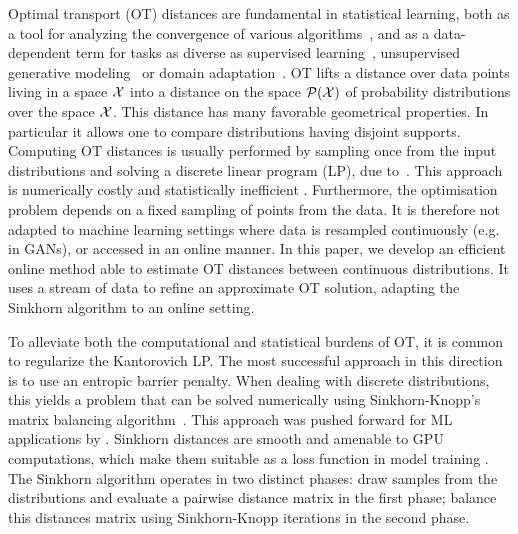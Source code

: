 
Optimal transport (OT) distances are fundamental in statistical learning, both
as a tool for analyzing the convergence of various
algorithms~\citep{canas2012learning,dalalyan2019user}, and as a data-dependent
term for tasks as diverse as supervised learning~\citep{frogner2015learning},
unsupervised generative modeling~\citep{arjovsky2017wgan} or domain
adaptation~\citep{courty2016optimal}.
%
OT lifts a distance over data points living in a space $\mathcal{X}$ into a distance
on the space $\mathcal{P}(\mathcal{X})$ of probability distributions over the space $\mathcal{X}$.
% 
%
This distance has many favorable geometrical properties. In particular it allows one to compare distributions having disjoint supports. 
% 
Computing OT distances is usually performed by sampling once from the input
distributions and solving a discrete linear program (LP), due
to~\citet{Kantorovich42}. This approach is numerically costly and statistically
inefficient \citep{weed2019sharp}. Furthermore, the optimisation problem depends on a fixed
sampling of points from the data. It is therefore not adapted to machine
learning settings where data is resampled continuously (e.g. in GANs), or
accessed in an online manner. In this paper, we develop an efficient
online method able to estimate OT distances between continuous distributions. It uses 
a stream of data to refine an approximate OT solution,
adapting the Sinkhorn algorithm to an online setting.
  


To alleviate both the computational and statistical burdens of OT, it is common
to regularize the Kantorovich LP.
%
The most successful approach in this direction is to use an entropic barrier penalty. 
%
When dealing with discrete distributions, this yields a problem that can be solved
numerically using Sinkhorn-Knopp's matrix balancing
algorithm~\citep{Sinkhorn64,sinkhorn1967concerning}.
%
This approach was pushed forward for ML applications by
\citet{cuturi2013sinkhorn}. Sinkhorn distances are smooth and amenable to GPU
computations, which make them suitable as a loss function in model training \citep{frogner2015learning, mensch_geometric_2019}.
The Sinkhorn algorithm operates in two distinct phases: draw samples from the
distributions and evaluate a pairwise distance matrix in the first phase;
balance this distances matrix using Sinkhorn-Knopp iterations in the second
phase.

